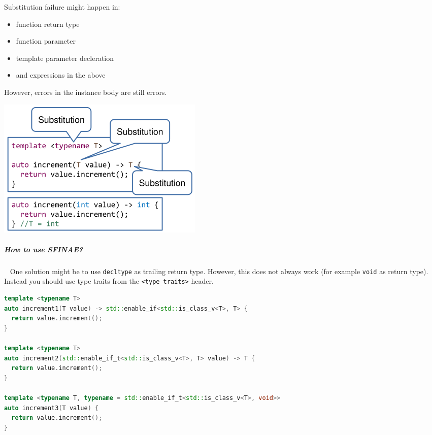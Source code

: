 \documentclass[11pt,twoside,landscape]{article}
\begin{document}
\begin{multicols}{2}
Substitution failure might happen in:
\begin{itemize}
\item function return type
\item function parameter
\item template parameter decleration
\item and expressions in the above
\end{itemize}


However, errors in the instance body are still errors.


{
\begin{center}
\includegraphics[width=.9\linewidth]{img/sfinae_locations.png}
\end{center}
\label{fig:positions-for-substituion}
}
\subparagraph{How to use SFINAE?} \
\label{sec:org9dca773}
One solution might be to use \texttt{decltype} as trailing return type.
However, this does not always work (for example \texttt{void} as return type).
Instead you should use type traits from the \texttt{<type\_traits>} header.

\begin{lstlisting}[language=c++,label=lst:example-useage-for-sfinae,caption={Example useage for SFINAE},captionpos=b,numbers=none]
template <typename T>
auto increment1(T value) -> std::enable_if<std::is_class_v<T>, T> {
  return value.increment();
}

template <typename T>
auto increment2(std::enable_if_t<std::is_class_v<T>, T> value) -> T {
  return value.increment();
}

template <typename T, typename = std::enable_if_t<std::is_class_v<T>, void>>
auto increment3(T value) {
  return value.increment();
}

\end{lstlisting}


\end{multicols}
\end{document}
